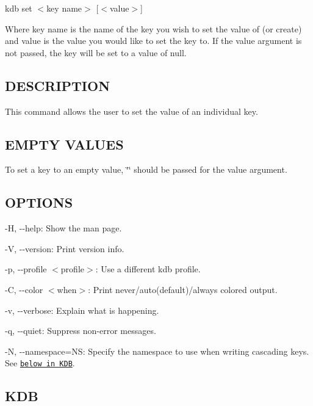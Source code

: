 {\ttfamily kdb set $<$key name$>$ \mbox{[}$<$value$>$\mbox{]}}

Where {\ttfamily key name} is the name of the key you wish to set the value of (or create) and {\ttfamily value} is the value you would like to set the key to. If the {\ttfamily value} argument is not passed, the key will be set to a value of {\ttfamily null}.

\subsection*{D\+E\+S\+C\+R\+I\+P\+T\+I\+ON}

This command allows the user to set the value of an individual key.

\subsection*{E\+M\+P\+TY V\+A\+L\+U\+ES}

To set a key to an empty value, {\ttfamily \char`\"{}\char`\"{}} should be passed for the {\ttfamily value} argument.

\subsection*{O\+P\+T\+I\+O\+NS}


\begin{DoxyItemize}
\item {\ttfamily -\/H}, {\ttfamily -\/-\/help}\+: Show the man page.
\item {\ttfamily -\/V}, {\ttfamily -\/-\/version}\+: Print version info.
\item {\ttfamily -\/p}, {\ttfamily -\/-\/profile $<$profile$>$}\+: Use a different kdb profile.
\item {\ttfamily -\/C}, {\ttfamily -\/-\/color $<$when$>$}\+: Print never/auto(default)/always colored output.
\item {\ttfamily -\/v}, {\ttfamily -\/-\/verbose}\+: Explain what is happening.
\item {\ttfamily -\/q}, {\ttfamily -\/-\/quiet}\+: Suppress non-\/error messages.
\item {\ttfamily -\/N}, {\ttfamily -\/-\/namespace=NS}\+: Specify the namespace to use when writing cascading keys. See \href{#KDB}{\tt below in K\+DB}.
\end{DoxyItemize}

\subsection*{K\+DB}


